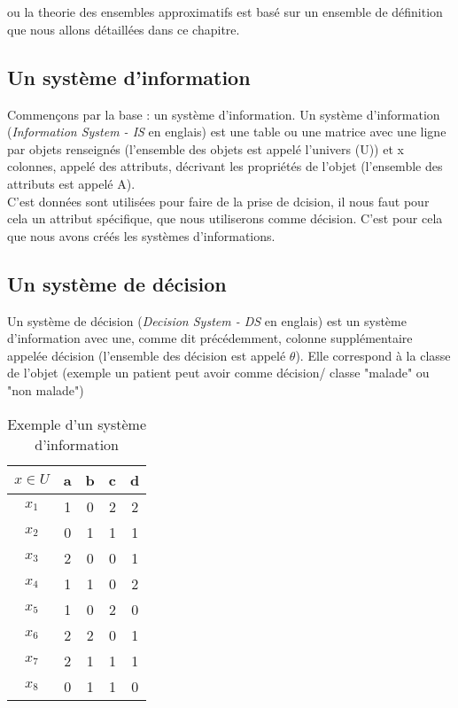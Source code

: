 \section{\rst}
\rst ou la theorie des ensembles
approximatifs est basé sur un ensemble de définition que nous allons
détaillées dans ce chapitre.

\subsection{Un système d'information}
Commençons par la base : un système d'information. Un système
d'information (\textit{Information System - IS} en englais) est
une table ou une matrice avec une ligne par objets renseignés
(l'ensemble des objets est appelé l'univers (U)) et x colonnes,
appelé des attributs, décrivant les propriétés de l'objet
(l'ensemble des attributs est appelé A). \\

C'est données sont utilisées pour faire de la prise de
dcision, il nous faut pour cela un attribut spécifique,
que nous utiliserons comme décision. C'est pour cela
que nous avons créés les systèmes d'informations.

\subsection{Un système de décision}
Un système de décision (\textit{Decision System - DS}
en englais) est un système
d'information avec une, comme dit précédemment,
colonne supplémentaire appelée décision
(l'ensemble des décision est appelé $\theta$). Elle correspond
à la classe de l'objet (exemple un patient peut avoir comme
décision/ classe "malade" ou "non malade")
\begin{table}[h!]
    \centering
    \begin{tabular}{|c||c|c|c|c|}
        \hline
        $x \in U$ & a & b & c & d \\
        \hline
        $x_1$     & 1 & 0 & 2 & 2 \\
        $x_2$     & 0 & 1 & 1 & 1 \\
        $x_3$     & 2 & 0 & 0 & 1 \\
        $x_4$     & 1 & 1 & 0 & 2 \\
        $x_5$     & 1 & 0 & 2 & 0 \\
        $x_6$     & 2 & 2 & 0 & 1 \\
        $x_7$     & 2 & 1 & 1 & 1 \\
        $x_8$     & 0 & 1 & 1 & 0 \\
        \hline
    \end{tabular}
    \caption{Exemple d'un système d'information}
    \label{tab:msysteme_information}
\end{table}

